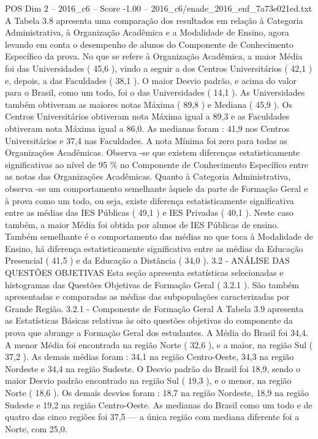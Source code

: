 \begin{textsample}{POS Dim 2 – 2016\_c6 – Score -1.00 – 2016\_c6/enade\_2016\_enf\_7a73e021ed.txt}
A Tabela 3.8 apresenta uma comparação dos resultados em relação à Categoria Administrativa, à Organização Acadêmica e a Modalidade de Ensino, agora levando em conta o desempenho de alunos do Componente de Conhecimento Específico da prova.
No que se refere à Organização Acadêmica, a maior Média foi das Universidades ( 45,6 ), vindo a seguir a dos Centros Universitários ( 42,1 ) e, depois, a das Faculdades ( 38,1 ).
O maior Desvio padrão, e acima do valor para o Brasil, como um todo, foi o das Universidades ( 14,1 ).
As Universidades também obtiveram as maiores notas Máxima ( 89,8 ) e Mediana ( 45,9 ).
Os Centros Universitários obtiveram nota Máxima igual a 89,3 e as Faculdades obtiveram nota Máxima igual a 86,0.
As medianas foram : 41,9 nos Centros Universitários e 37,4 nas Faculdades.
A nota Mínima foi zero para todas as Organizações Acadêmicas.
Observa -se que existem diferenças estatisticamente significativas ao nível de 95 \% no Componente de Conhecimento Específico entre as notas das Organizações Acadêmicas.
Quanto à Categoria Administrativa, observa -se um comportamento semelhante àquele da parte de Formação Geral e à prova como um todo, ou seja, existe diferença estatisticamente significativa entre as médias das IES Públicas ( 49,1 ) e IES Privadas ( 40,1 ).
Neste caso também, a maior Média foi obtida por alunos de IES Públicas de ensino.
Também semelhante é o comportamento das médias no que toca à Modalidade de Ensino, há diferença estatisticamente significativa entre as médias da Educação Presencial ( 41,5 ) e da Educação a Distância ( 34,0 ). 3.2 - ANÁLISE DAS QUESTÕES OBJETIVAS Esta seção apresenta estatísticas selecionadas e histogramas das Questões Objetivas de Formação Geral ( 3.2.1 ).
São também apresentadas e comparadas as médias das subpopulações caracterizadas por Grande Região. 3.2.1 - Componente de Formação Geral A Tabela 3.9 apresenta as Estatísticas Básicas relativas às oito questões objetivas do componente da prova que abrange a Formação Geral dos estudantes.
A Média do Brasil foi 34,4.
A menor Média foi encontrada na região Norte ( 32,6 ), e a maior, na região Sul ( 37,2 ).
As demais médias foram : 34,1 na região Centro-Oeste, 34,3 na região Nordeste e 34,4 na região Sudeste.
O Desvio padrão do Brasil foi 18,9, sendo o maior Desvio padrão encontrado na região Sul ( 19,3 ), e o menor, na região Norte ( 18,6 ).
Os demais desvios foram : 18,7 na região Nordeste, 18,9 na região Sudeste e 19,2 na região Centro-Oeste.
As medianas do Brasil como um todo e de quatro das cinco regiões foi 37,5 — a única região com mediana diferente foi a Norte, com 25,0.

\end{textsample}
